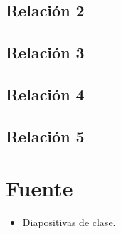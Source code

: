 \documentclass[a4paper,12pt]{article}
\begin{document}
\subsection{Relación 2}


\subsection{Relación 3}
%


\subsection{Relación 4}


\subsection{Relación 5}



\section{Fuente}
\begin{itemize}
    \item Diapositivas de clase.
\end{itemize}
\end{document}
